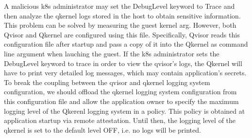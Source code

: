 A malicious k8s administrator may set the DebugLevel keyword to Trace and then analyze the qkernel logs stored in the host to obtain sensitive information. 
This problem can be solved by measuring the guest kernel arg. However, both Qvisor and Qkernel are configured using this file. Specifically, Qvisor reads this configuration file after startup and pass a copy of it into the Qkernel as command 
line argument when lauching the guest. If the k8s administrator sets the DebugLevel keyword to trace in order to view the qvisor's logs, the Qkernel will have to print very detailed log messages, which may contain application’s secrets. 
To break the coupling between the qvisor and qkernel logging system configuration, we should offload the qkernel logging system configuration from this configuration file and allow the application owner to specify the maximum logging level of the 
Qkerenl logging system in a policy. This policy is obtained at application startup via remote attestation. Until then, the logging level of the qkernel is set to the default level OFF, i.e. no logs will be printed.




\cleardoublepage

